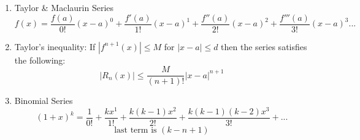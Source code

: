 \documentclass[11pt]{article}
\begin{document}
{\begin{enumerate}
\begin{enumerate}
        \item Ratio test:
        $$\lim_{n\hookrightarrow\infty}\left|\frac{a_{n+1}}{a_n}\right|\{<=>\}\;1$$
        \item Root test:
        $$\lim_{n\hookrightarrow\infty}^n\sqrt{a_n}\;\{<=>\}\;1$$
    \end{enumerate}
    \item Taylor \& Maclaurin Series
    $$f(x)=\frac{f(a)}{0!}(x-a)^0+\frac{f'(a)}{1!}(x-a)^1+\frac{f''(a)}{2!}(x-a)^2+\frac{f'''(a)}{3!}(x-a)^3...$$
    \item Taylor's inequality: If $|f^{n+1}(x)|\leq M$ for $|x-a|\leq d$ then the series satisfies the following:
    $$|R_n(x)|\leq\frac{M}{(n+1)!}|x-a|^{n+1}$$
    \item Binomial Series
    $$(1+x)^k=\frac{1}{0!}+\frac{kx^1}{1!}+\frac{k(k-1)x^2}{2!}+\frac{k(k-1)(k-2)x^3}{3!}+...$$
    $$\text{last term is }(k-n+1)$$
\end{enumerate}
} 
\end{document}
